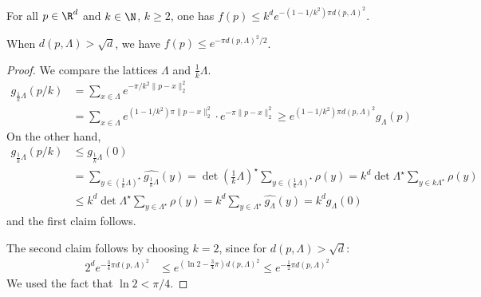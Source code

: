 \begin{lemma}
  \label{lemma:f-small-close-to-lattice}
  For all $p \in \R^d$ and $k \in \N$, $k \geq 2$,
  one has $f(p) \leq k^d e^{-(1-1/k^2) \pi d(p,\Lambda)^2}$.

  When $d(p,\Lambda) > \sqrt{d}$, we have $f(p) \leq e^{-\pi d(p,\Lambda)^2 / 2}$.
\end{lemma}
\begin{proof}
  We compare the lattices $\Lambda$ and $\frac{1}{k} \Lambda$.
  \begin{align*}
    g_{\frac{1}{k}\Lambda}(p/k) &= \sum_{x\in\Lambda} e^{-\pi/k^2 \|p - x\|_2^2} \\
      &= \sum_{x \in\Lambda} e^{(1-1/k^2) \pi \|p - x\|_2^2} \cdot e^{-\pi \|p - x\|_2^2}
      \geq e^{(1-1/k^2) \pi d(p,\Lambda)^2} g_\Lambda(p)
  \end{align*}
  On the other hand,
  \begin{align*}
    g_{\frac{1}{k}\Lambda}(p/k)
      &\leq g_{\frac{1}{k}\Lambda}(0) \\
      &= \sum_{y \in (\frac{1}{k}\Lambda)^\star} \widehat{g_{\frac{1}{k}\Lambda}}(y)
      = \det (\frac{1}{k}\Lambda)^\star \sum_{y \in (\frac{1}{k}\Lambda)^\star} \rho(y)
      = k^d \det\Lambda^\star \sum_{y \in k\Lambda^\star} \rho(y) \\
      &\leq k^d \det\Lambda^\star \sum_{y \in \Lambda^\star} \rho(y)
      = k^d \sum_{y\in\Lambda^\star} \widehat{g_\Lambda}(y) = k^d g_\Lambda(0)
  \end{align*}
  and the first claim follows.

  The second claim follows by choosing $k = 2$,
  since for $d(p,\Lambda) > \sqrt{d}$:
  \begin{align*}
    2^d e^{-\frac{3}{4} \pi d(p,\Lambda)^2}
      &\leq e^{(\ln 2 - \frac{3}{4}\pi) d(p,\Lambda)^2} \leq e^{-\frac{1}{2} \pi d(p, \Lambda)^2}
  \end{align*}
  We used the fact that $\ln 2 < \pi/4$.
\end{proof}

